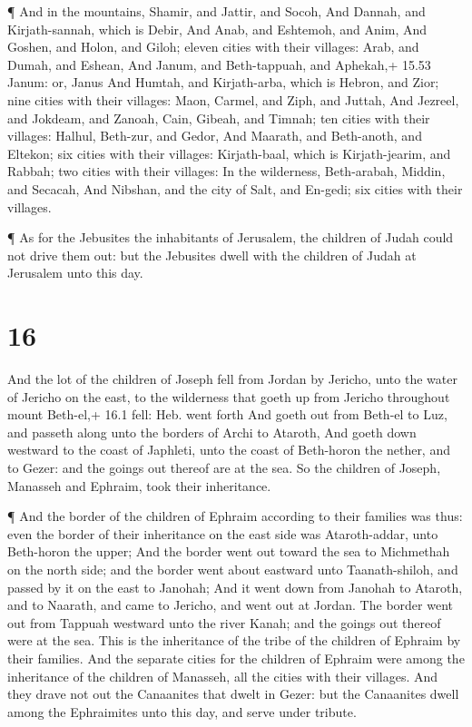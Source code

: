  ¶ And in the mountains, Shamir, and Jattir, and Socoh,
 And Dannah, and Kirjath-sannah, which is Debir,
 And Anab, and Eshtemoh, and Anim,  And
Goshen, and Holon, and Giloh; eleven cities with their villages:
 Arab, and Dumah, and Eshean,  And Janum, and
Beth-tappuah, and Aphekah,+ 15.53 Janum: or, Janus  And
Humtah, and Kirjath-arba, which is Hebron, and Zior; nine cities with
their villages:  Maon, Carmel, and Ziph, and Juttah,
 And Jezreel, and Jokdeam, and Zanoah,  Cain,
Gibeah, and Timnah; ten cities with their villages: 
Halhul, Beth-zur, and Gedor,  And Maarath, and Beth-anoth,
and Eltekon; six cities with their villages:  Kirjath-baal,
which is Kirjath-jearim, and Rabbah; two cities with their villages:
 In the wilderness, Beth-arabah, Middin, and Secacah,
 And Nibshan, and the city of Salt, and En-gedi; six cities
with their villages.

 ¶ As for the Jebusites the inhabitants of Jerusalem, the
children of Judah could not drive them out: but the Jebusites dwell with
the children of Judah at Jerusalem unto this day.

\hypertarget{section-15}{%
\section{16}\label{section-15}}

 And the lot of the children of Joseph fell from Jordan by
Jericho, unto the water of Jericho on the east, to the wilderness that
goeth up from Jericho throughout mount Beth-el,+ 16.1 fell: Heb. went
forth  And goeth out from Beth-el to Luz, and passeth along
unto the borders of Archi to Ataroth,  And goeth down
westward to the coast of Japhleti, unto the coast of Beth-horon the
nether, and to Gezer: and the goings out thereof are at the sea.
 So the children of Joseph, Manasseh and Ephraim, took their
inheritance.

 ¶ And the border of the children of Ephraim according to
their families was thus: even the border of their inheritance on the
east side was Ataroth-addar, unto Beth-horon the upper;  And
the border went out toward the sea to Michmethah on the north side; and
the border went about eastward unto Taanath-shiloh, and passed by it on
the east to Janohah;  And it went down from Janohah to
Ataroth, and to Naarath, and came to Jericho, and went out at Jordan.
 The border went out from Tappuah westward unto the river
Kanah; and the goings out thereof were at the sea. This is the
inheritance of the tribe of the children of Ephraim by their families.
 And the separate cities for the children of Ephraim were
among the inheritance of the children of Manasseh, all the cities with
their villages.  And they drave not out the Canaanites that
dwelt in Gezer: but the Canaanites dwell among the Ephraimites unto this
day, and serve under tribute.

